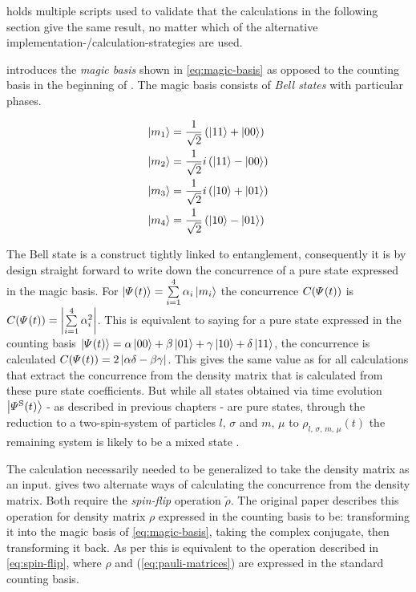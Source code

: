  holds multiple scripts used to validate that the calculations in the following section give the same result, no matter which of the alternative implementation-/calculation-strategies are used.

\cite{concurrenceMainPaper} introduces the \emph{magic basis} shown in \autoref{eq:magic-basis} as opposed to the counting basis in the beginning of . 
The magic basis consists of \emph{Bell states} with particular phases.

\begin{equation}
    \label{eq:magic-basis}
    \begin{split}
        \ketN[m_1] &= \frac{1}{\sqrt{2}} \left(\ketN[11] + \ketN[00]\right) \\
        \ketN[m_2] &= \frac{1}{\sqrt{2}} i \left(\ketN[11] - \ketN[00]\right) \\
        \ketN[m_3] &= \frac{1}{\sqrt{2}} i \left(\ketN[10] + \ketN[01]\right) \\
        \ketN[m_4] &= \frac{1}{\sqrt{2}} \left(\ketN[10] - \ketN[01]\right) \\
    \end{split}
\end{equation}

The Bell state is a construct tightly linked to entanglement, consequently it is by design straight forward to write down the concurrence of a pure state expressed in the magic basis.
For $\ketN[\psiOfT] = \sum\limits_{i=1}^4 \alpha_i \ketN[m_i]$ the concurrence $C(\psiOfT)$ is $C(\psiOfT) = \left|\sum\limits_{i=1}^4 \alpha_i^2 \right|$.
This is equivalent to saying for a pure state expressed in the counting basis $\ketN[\psiOfT] = \alpha \ketN[00] +  \beta \ketN[01] +  \gamma \ketN[10] +  \delta\ketN[11]$, the concurrence is calculated $C(\psiOfT) = 2 \left|\alpha \delta - \beta \gamma\right|$.
This gives the same value as for all calculations that extract the concurrence from the density matrix that is calculated from these pure state coefficients.
But while all states obtained via time evolution $\ketN[{\psiOfT[\schroedingerPicture]}]$ - as described in previous chapters - are pure states, through the reduction to a \glqq two-spin-system\grqq{} of particles $l,\,\sigma$ and $m,\,\mu$ to $\rho_{l,\,\sigma,\,m,\,\mu} (t)$ the remaining system is likely to be a mixed state \cite{mixedStateFromPureState}.

The calculation necessarily needed to be generalized to take the density matrix as an input.
\cite{concurrenceRewording} gives two alternate ways of calculating the concurrence from the density matrix.
Both require the \emph{spin-flip} operation $\tilde{\rho}$.
The original paper \cite{concurrenceMainPaper} describes this operation for density matrix $\rho$ expressed in the counting basis to be: transforming it into the magic basis of \autoref{eq:magic-basis}, taking the complex conjugate, then transforming it back.
As per \cite{concurrenceRewording} this is equivalent to the operation described in \autoref{eq:spin-flip}, where $\rho$ and  (\autoref{eq:pauli-matrices}) are expressed in the standard counting basis.

